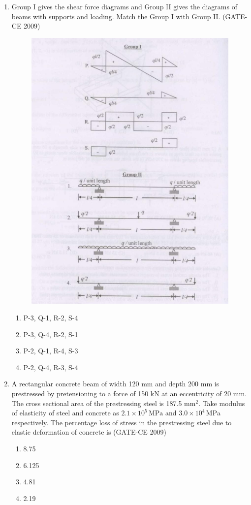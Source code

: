 \documentclass[journal,12pt,onecolumn]{article}
\theoremstyle{remark}
\begin{document}
\begin{enumerate}
    \item Group I gives the shear force diagrams and Group II gives the diagrams of beams with supports and loading. Match the Group I with Group II. (GATE-CE 2009)

    \begin{figure}[H]
        \centering
        \includegraphics[width=0.7\columnwidth]{figs/image3.jpg}
        \caption{}
        \label{fig:placeholder}
    \end{figure}
    
    \begin{enumerate}
        \item P-3, Q-1, R-2, S-4 
        \item P-3, Q-4, R-2, S-1 
        \item P-2, Q-1, R-4, S-3 
        \item P-2, Q-4, R-3, S-4
    \end{enumerate}
    
    \item A rectangular concrete beam of width 120 mm and depth 200 mm is prestressed by pretensioning to a force of 150 kN at an eccentricity of 20 mm. The cross sectional area of the prestressing steel is 187.5 mm$^2$. Take modulus of elasticity of steel and concrete as $2.1 \times 10^5\, \text{MPa}$ and $3.0 \times 10^4\, \text{MPa}$ respectively. The percentage loss of stress in the prestressing steel due to elastic deformation of concrete is (GATE-CE 2009)
    \begin{enumerate}
        \item 8.75 
        \item 6.125 
        \item 4.81 
        \item 2.19
    \end{enumerate}
    

\end{enumerate}
\end{document}
